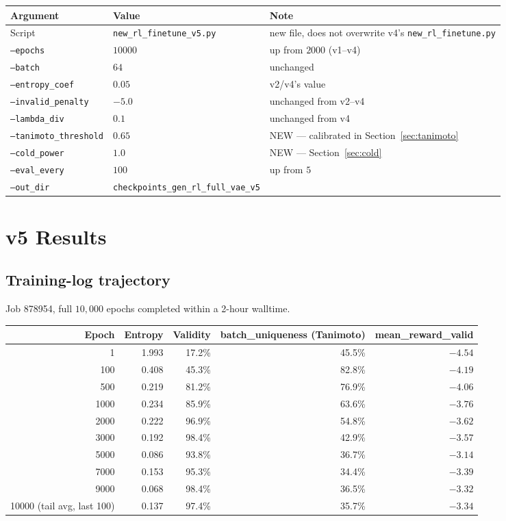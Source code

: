 \documentclass[11pt]{article}
\newcommand{\code}[1]{\texttt{#1}}
\begin{document}
\begin{center}
\begin{tabular}{@{}l l p{}@{}}
\toprule
\textbf{Argument} & \textbf{Value} & \textbf{Note} \\
\midrule
Script & \code{\small new\_rl\_finetune\_v5.py} & new file, does not overwrite v4's \code{\small new\_rl\_finetune.py} \\
\code{--epochs} & $10000$ & up from $2000$ (v1--v4) \\
\code{--batch} & $64$ & unchanged \\
\code{--entropy\_coef} & $0.05$ & v2/v4's value \\
\code{--invalid\_penalty} & $-5.0$ & unchanged from v2--v4 \\
\code{--lambda\_div} & $0.1$ & unchanged from v4 \\
\code{--tanimoto\_threshold} & $0.65$ & NEW --- calibrated in Section~\ref{sec:tanimoto} \\
\code{--cold\_power} & $1.0$ & NEW --- Section~\ref{sec:cold} \\
\code{--eval\_every} & $100$ & up from $5$ \\
\code{--out\_dir} & \code{checkpoints\_gen\_rl\_full\_vae\_v5} & \\
\bottomrule
\end{tabular}
\end{center}

\section{v5 Results}

\subsection{Training-log trajectory}

Job 878954, full $10{,}000$ epochs completed within a 2-hour walltime.

\begin{center}
\begin{tabular}{@{}r r r r r@{}}
\toprule
\textbf{Epoch} & \textbf{Entropy} & \textbf{Validity} & \textbf{batch\_uniqueness (Tanimoto)} & \textbf{mean\_reward\_valid} \\
\midrule
1     & 1.993 & 17.2\% & 45.5\% & $-4.54$ \\
100   & 0.408 & 45.3\% & 82.8\% & $-4.19$ \\
500   & 0.219 & 81.2\% & 76.9\% & $-4.06$ \\
1000  & 0.234 & 85.9\% & 63.6\% & $-3.76$ \\
2000  & 0.222 & 96.9\% & 54.8\% & $-3.62$ \\
3000  & 0.192 & 98.4\% & 42.9\% & $-3.57$ \\
5000  & 0.086 & 93.8\% & 36.7\% & $-3.14$ \\
7000  & 0.153 & 95.3\% & 34.4\% & $-3.39$ \\
9000  & 0.068 & 98.4\% & 36.5\% & $-3.32$ \\
10000 (tail avg, last 100) & 0.137 & 97.4\% & 35.7\% & $-3.34$ \\
\bottomrule
\end{tabular}
\end{center}
\end{document}
